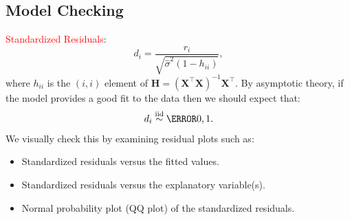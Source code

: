 \documentclass{article}\usepackage[]{graphicx}\usepackage[svgnames]{xcolor}
\newcommand*\circled[1]{\tikz[baseline=(char.base)]{\node[shape=circle,draw,inner sep=2pt] (char) {#1};}}
\newcommand{\iid}{\overset{\text{iid}}{\sim}}%
\providecommand{\Matrix}[1]{\bm{#1}}
\begin{document}
\subsection*{\circled{3} Model Checking}
\textcolor{Red}{Standardized Residuals}:
\[ d_i=\frac{r_i}{\sqrt{\hat{\sigma}^2(1-h_{ii})}},  \]
where $ h_{ii} $ is the $ (i,i) $ element of $ \Matrix{H}=(\Matrix{X}^\top\Matrix{X})^{-1}\Matrix{X}^\top $.
By asymptotic theory, if the model provides a good fit to the data then we
should expect that:
\[ d_i\iid \N{0,1}. \]
We visually check this by examining residual plots such as:
\begin{itemize}
      \item Standardized residuals versus the fitted values.
      \item Standardized residuals versus the explanatory variable(s).
      \item Normal probability plot (QQ plot) of the standardized residuals.
\end{itemize}
\end{document}
